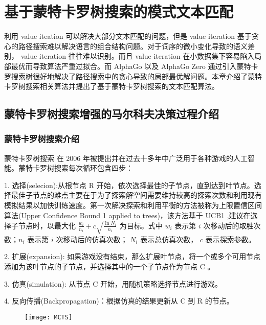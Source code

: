 \chapter{基于蒙特卡罗树搜索的模式文本匹配}
\label{chap:Zero}
利用 value iteation 可以解决大部分文本匹配的问题，但是 value iteration 基于贪心的路径搜索难以解决语言的组合结构问题。对于词序的微小变化导致的语义差别， value iteration 往往难以识别。而且 value iteration 在小数据集下容易陷入局部最优而导致算法严重过拟合。而 AlphaGo 以及 AlphaGo Zero 通过引入蒙特卡罗搜索树很好地解决了路径搜索中的贪心导致的局部最优解问题。本章介绍了蒙特卡罗树搜索相关算法并提出了基于蒙特卡罗树搜索的文本匹配算法。

\section{蒙特卡罗树搜索增强的马尔科夫决策过程介绍}
\subsection{蒙特卡罗树搜索介绍}\label{sec:MCTS_intro}
蒙特卡罗树搜索\cite{Coulom2006EfficientSA} 在 2006 年被提出并在过去十多年中广泛用于各种游戏的人工智能\cite{Lorentz2008AmazonsDM, Enzenberger2010FuegoA,Buro2009ImprovingSE}。蒙特卡罗树搜索每次循环包含四步：

1. 选择(selecion):从根节点 R 开始，依次选择最佳的子节点，直到达到叶节点。选择最佳子节点的难点主要在于为了探索解空间需要维持较高的探索次数和利用现有模拟结果以加快训练速度。第一次解决探索和利用平衡的方法被称为上限置信区间算法\cite{Kocsis2006BanditBM}(Upper Confidence Bound 1 applied to trees)，该方法基于 UCB1 \cite{Auer2002FinitetimeAO},建议在选择子节点时，以最大化 $\frac{w_i}{n_i} + c\sqrt{\frac{\ln N_i}{n_i}}$ 为目标。式中 $w_i$ 表示第 $i$ 次移动后的取胜次数；$n_i$ 表示第 $i$ 次移动后的仿真次数； $N_i$ 表示总仿真次数， $c$ 表示探索参数。

2. 扩展(expansion): 如果游戏没有结束，那么扩展叶节点，将一个或多个可用节点添加为该叶节点的子节点，并选择其中的一个子节点作为节点 C 。

3. 仿真(simulation): 从节点 C 开始，用随机策略选择节点进行游戏。

4. 反向传播(Backpropagation)：根据仿真的结果更新从 C 到 R 的节点。

\begin{figure}[H]
    \centering
    \texttt{[image: MCTS]}
    \label{fig:MCTS}
\end{figure}

